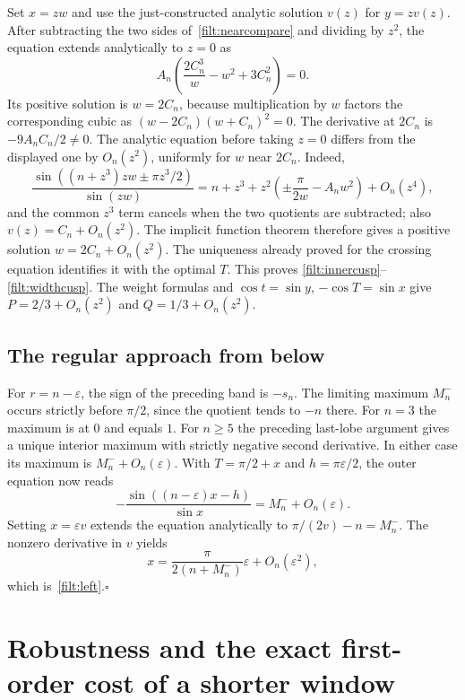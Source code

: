 Set $x=zw$ and use the just-constructed analytic solution $v(z)$ for
$y=zv(z)$.  After subtracting the two sides
of~\eqref{filt:nearcompare} and dividing by $z^2$, the equation extends
analytically to $z=0$ as
\begin{equation}\label{filt:reducedcubic}
 A_n\left(\frac{2C_n^3}{w}-w^2+3C_n^2\right)=0.
\end{equation}
Its positive solution is $w=2C_n$, because multiplication by $w$ factors
the corresponding cubic as
$(w-2C_n)(w+C_n)^2=0$.
The derivative at $2C_n$ is $-9A_nC_n/2\ne0$.
The analytic equation before taking $z=0$ differs from the displayed
one by $O_n(z^2)$, uniformly for $w$ near $2C_n$. Indeed,
\[
 \frac{\sin((n+z^3)zw\pm\pi z^3/2)}{\sin(zw)}
 =n+z^3+z^2\left(\pm\frac{\pi}{2w}-A_nw^2\right)+O_n(z^4),
\]
and the common $z^3$ term cancels when the two quotients are subtracted;
also $v(z)=C_n+O_n(z^2)$.
The implicit function theorem therefore gives a positive solution
$w=2C_n+O_n(z^2)$.  The uniqueness already proved for the crossing equation
identifies it with the optimal $T$.  This proves
\eqref{filt:innercusp}--\eqref{filt:widthcusp}.
The weight formulas and
$\cos t=\sin y$, $-\cos T=\sin x$ give
$P=2/3+O_n(z^2)$ and $Q=1/3+O_n(z^2)$.

\subsection{The regular approach from below}

For $r=n-\varepsilon$, the sign of the preceding band is $-s_n$.
The limiting maximum $M_n^-$ occurs strictly before $\pi/2$, since the
quotient tends to $-n$ there.  For $n=3$ the maximum is at $0$ and equals
$1$.  For $n\ge5$ the preceding last-lobe argument gives a unique interior
maximum with strictly negative second derivative.  In either case its
maximum is $M_n^-+O_n(\varepsilon)$.
With $T=\pi/2+x$ and $h=\pi\varepsilon/2$, the outer equation now reads
\[
 -\frac{\sin((n-\varepsilon)x-h)}{\sin x}
      =M_n^-+O_n(\varepsilon).
\]
Setting $x=\varepsilon v$ extends the equation analytically to
$\pi/(2v)-n=M_n^-$.  The nonzero derivative in $v$ yields
\[
 x=\frac{\pi}{2(n+M_n^-)}\varepsilon+O_n(\varepsilon^2),
\]
which is~\eqref{filt:left}.\hfill$\square$

\section{Robustness and the exact first-order cost of a shorter window}


